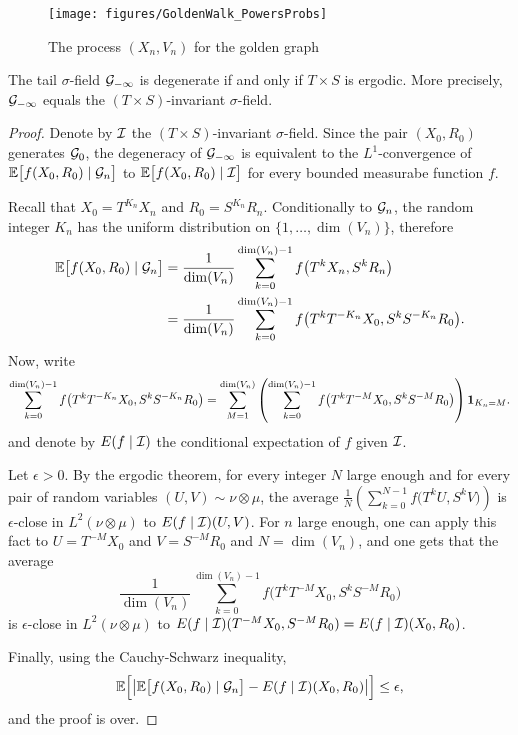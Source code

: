 \documentclass[12pt,a4paper]{article}
\begin{document}
\begin{figure}[!h]
\centering
	\texttt{[image: figures/GoldenWalk\_PowersProbs]}
\caption{The process $(X_n, V_n)$ for the golden graph}
\end{figure}

\begin{ppsition}\label{ppsition:tailfield}
The tail $\sigma$-field $\mathcal{G}_{-\infty}$ is degenerate if and only if $T \times S$ is ergodic. 
More precisely, $\mathcal{G}_{-\infty}$ equals  the $(T\times S)$-invariant $\sigma$-field. 
\end{ppsition}
 
\begin{proof}
Denote by $\mathcal{I}$ the $(T\times S)$-invariant $\sigma$-field. 
Since the pair $(X_0, R_0)$ generates $\mathcal{G}_0$, the degeneracy of $\mathcal{G}_{-\infty}$ 
is equivalent to the $L^1$-convergence of 
$\mathbb{E}\bigl[f(X_0, R_0) \mid \mathcal{G}_n\bigr]$ to $\mathbb{E}\bigl[f(X_0, R_0) \mid \mathcal{I}\bigr]$   
for every bounded measurabe function $f$. 

Recall that $X_{0} = T^{K_n}X_n$ and $R_{0} = S^{K_n}R_n$. 
Conditionally to $\mathcal{G}_n$, the random integer $K_n$ 
has the uniform distribution on $\bigl\{1, \ldots, \dim(V_n)\bigr\}$, 
therefore 
\begin{align*}
\mathbb{E}\bigl[f(X_0, R_0) \mid \mathcal{G}_n\bigr]
& =\frac{1}{\dim(V_n)}\sum_{k=0}^{\dim(V_n)-1} f\bigl(T^kX_n, S^kR_n \bigr) \\
& = \frac{1}{\dim(V_n)}\sum_{k=0}^{\dim(V_n)-1} f\bigl(T^{k}T^{-K_n}X_0, S^{k}S^{-K_n}R_0 \bigr).
\end{align*}
Now, write 
$$
\sum_{k=0}^{\dim(V_n)-1} f\bigl(T^{k}T^{-K_n}X_0, S^{k}S^{-K_n}R_0 \bigr) = 
\sum_{M=1}^{\dim(V_n)} \left(\sum_{k=0}^{\dim(V_n)-1} f\bigl(T^kT^{-M}X_0, S^kS^{-M}R_0 \bigr) \right)\boldsymbol 1_{K_n=M}.
$$
and denote by $E(f\mid\mathcal{I})$ the conditional expectation of $f$ given $\mathcal{I}$.

Let $\epsilon>0$. By the ergodic theorem, for every integer $N$ large enough and 
for every pair of random variables $(U,V) \sim \nu \otimes \mu$, the average 
$\frac{1}{N} \left(\sum_{k=0}^{N-1} f\bigl(T^k U, S^kV\bigr) \right)$ 
is $\epsilon$-close in $L^2(\nu \otimes \mu)$ to 
$E(f\mid\mathcal{I})(U,V)$. 
For $n$ large enough, one can apply this fact to $U=T^{-M}X_0$ and $V=S^{-M}R_0$ and 
$N=\dim(V_n)$, and one gets that the average 
$$
\frac{1}{\dim(V_n)}\sum_{k=0}^{\dim(V_n)-1} f\bigl(T^kT^{-M}X_0, S^kS^{-M}R_0 \bigr)
$$
is $\epsilon$-close in $L^2(\nu \otimes \mu)$ to 
$E(f\mid\mathcal{I})(T^{-M}X_0,S^{-M}R_0)=E(f\mid\mathcal{I})(X_0,R_0)$. 

Finally, using the Cauchy-Schwarz inequality,
$$
\mathbb{E}\Bigl[ \left| \mathbb{E}\bigl[f(X_0, R_0) \mid \mathcal{G}_n\bigr] - E(f\mid\mathcal{I})(X_0,R_0) \right| \Bigr] 
\leq \epsilon,
$$
and the proof is over.
\end{proof}
\end{document}
